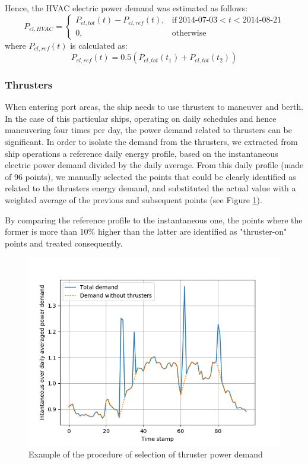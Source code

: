 \documentclass[preprint,12pt]{elsarticle}
\begin{document}
Hence, the HVAC electric power demand was estimated as follows:
\begin{equation}
P_{el,HVAC} =
\begin{cases}
P_{el,tot}(t) - P_{el,ref}(t) , & \text{if}\ \text{2014-07-03} < t < \text{2014-08-21} \\
0, & \text{otherwise}
\end{cases}
\end{equation}
where $P_{el,ref}(t)$ is calculated as:
\begin{equation}
P_{el,ref}(t) = 0.5 (P_{el,tot}(t_1) + P_{el,tot}(t_2))
\end{equation}


\subsubsection{Thrusters}

When entering port areas, the ship needs to use thrusters to maneuver and berth. In the case of this particular ships, operating on daily schedules and hence maneuvering four times per day, the power demand related to thrusters can be significant. In order to isolate the demand from the thrusters, we extracted from ship operations a reference daily energy profile, based on the instantaneous electric power demand divided by the daily average. From this daily profile (made of 96 points), we manually selected the points that could be clearly identified as related to the thrusters energy demand, and substituted the actual value with a weighted average of the previous and subsequent points (see Figure \ref{fig:thruster_selection}). 

By comparing the reference profile to the instantaneous one, the points where the former is more than 10\% higher than the latter are identified as "thruster-on" points and treated consequently. 

\begin{figure}
	\centering
	\includegraphics[width=0.9\linewidth]{Figures/Thruster_selection}
	\caption{Example of the procedure of selection of thruster power demand}
	\label{fig:thruster_selection}
\end{figure}
\end{document}
